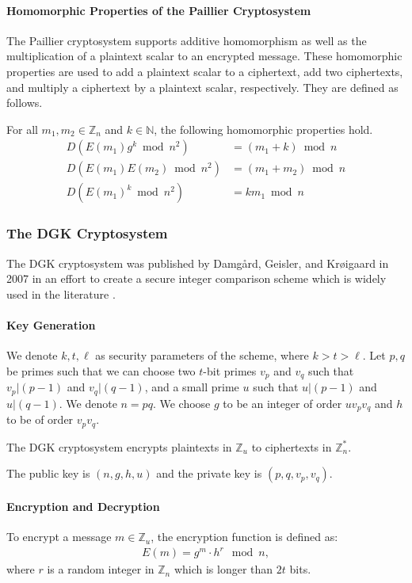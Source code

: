 \paragraph{Homomorphic Properties of the Paillier Cryptosystem}
The Paillier cryptosystem supports additive homomorphism as well as the multiplication of a plaintext scalar to an encrypted message. These homomorphic properties are used to add a plaintext scalar to a ciphertext, add two ciphertexts, and multiply a ciphertext by a plaintext scalar, respectively. They are defined as follows.

For all $m_1,m_2 \in \mathbb{Z}_n$ and $k\in \mathbb{N}$, the following homomorphic properties hold.
\begin{align*}
  D(E(m_1)g^k\bmod n^2) &=(m_1+k)\bmod n\\
  D(E(m_1)E(m_2)\bmod n^2) &=(m_1+m_2)\bmod n\\
  D(E(m_1)^k\bmod n^2) &= km_1\bmod n
\end{align*}

\subsubsection{The DGK Cryptosystem}
The DGK cryptosystem was published by Damg{\aa}rd, Geisler, and Kr{\o}igaard in 2007 in an effort to create a secure integer comparison scheme \cite{pieprzyk_efficient_2007, cryptoeprint:2008:321} which is widely used in the literature \cite{veugen_improving_2012}.

\paragraph{Key Generation}
We denote $k,t,\ell$ as security parameters of the scheme, where $k>t>\ell$.
Let $p,q$ be primes such that
we can choose two $t$-bit primes $v_p$ and $v_q$ such that $v_p | (p-1)$ and $v_q | (q-1)$, and a small prime $u$ such that $u | (p-1)$ and $u | (q-1)$.
We denote $n = pq$.
We choose $g$ to be an integer of order $uv_pv_q$ and $h$ to be of order $v_pv_q$.

The DGK cryptosystem encrypts plaintexts in $\mathbb{Z}_u$ to ciphertexts in $\mathbb{Z}_n^\ast$.

The public key is $(n,g,h,u)$ and the private key is $(p,q,v_p,v_q)$.

\paragraph{Encryption and Decryption}
To encrypt a message $m \in \mathbb{Z}_u$, the encryption function is defined as:
\begin{align*}
  E(m) = g^m \cdot h^r \mod{n},
\end{align*}
where $r$ is a random integer in $\mathbb{Z}_n$ which is longer than $2t$ bits.

